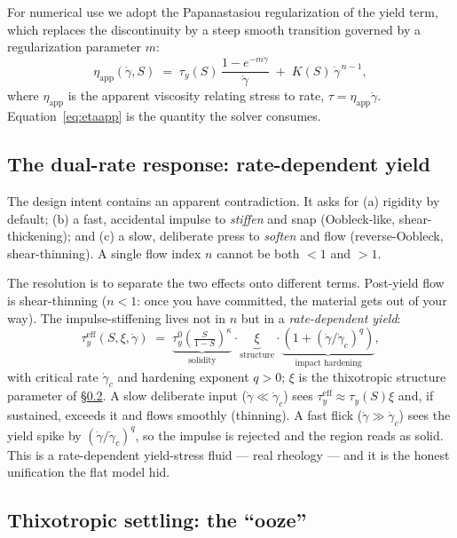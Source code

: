 \documentclass[11pt]{article}
\newcommand{\rate}{\dot{\gamma}}
\begin{document}
For numerical use we adopt the Papanastasiou regularization of the yield term, which replaces
the discontinuity by a steep smooth transition governed by a regularization parameter $m$:
\begin{equation}
\eta_{\text{app}}(\rate,S) \;=\;
\tau_y(S)\,\frac{1-e^{-m\rate}}{\rate}\;+\;K(S)\,\rate^{\,n-1},
\label{eq:etaapp}
\end{equation}
where $\eta_{\text{app}}$ is the apparent viscosity relating stress to rate,
$\tau=\eta_{\text{app}}\rate$. Equation~\eqref{eq:etaapp} is the quantity the solver consumes.

\subsection{The dual-rate response: rate-dependent yield}\label{sec:dualrate}

The design intent contains an apparent contradiction. It asks for (a) rigidity by default;
(b) a fast, accidental impulse to \emph{stiffen} and snap (Oobleck-like, shear-thickening);
and (c) a slow, deliberate press to \emph{soften} and flow (reverse-Oobleck, shear-thinning).
A single flow index $n$ cannot be both $<1$ and $>1$.

The resolution is to separate the two effects onto different terms. Post-yield flow is
shear-thinning ($n<1$: once you have committed, the material gets out of your way). The
impulse-stiffening lives not in $n$ but in a \emph{rate-dependent yield}:
\begin{equation}
\tau_y^{\text{eff}}(S,\xi,\rate)
\;=\;
\underbrace{\tau_y^{0}\!\left(\tfrac{S}{1-S}\right)^{\!\kappa}}_{\text{solidity}}
\cdot
\underbrace{\xi}_{\text{structure}}
\cdot
\underbrace{\left(1+\left(\rate/\rate_c\right)^{q}\right)}_{\text{impact hardening}},
\label{eq:dualrate}
\end{equation}
with critical rate $\rate_c$ and hardening exponent $q>0$; $\xi$ is the thixotropic structure
parameter of \S\ref{sec:thixo}. A slow deliberate input ($\rate\ll\rate_c$) sees
$\tau_y^{\text{eff}}\approx\tau_y(S)\xi$ and, if sustained, exceeds it and flows smoothly (thinning).
A fast flick ($\rate\gg\rate_c$) sees the yield spike by $(\rate/\rate_c)^q$, so the impulse is
rejected and the region reads as solid. This is a rate-dependent yield-stress fluid --- real
rheology --- and it is the honest unification the flat model hid.

\subsection{Thixotropic settling: the ``ooze''}\label{sec:thixo}
\end{document}

